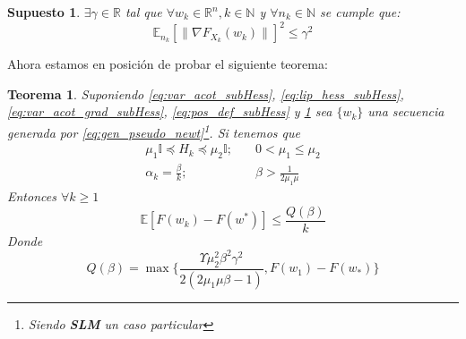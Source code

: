 \documentclass{book}
\theoremstyle{plain}
\newtheorem{thm}{Teorema}[section]
\newtheorem{assump}{Supuesto}[thm]
\theoremstyle{definition}
\theoremstyle{remark}
\begin{document}
 \begin{assump}\label{assump:moment_cota}
 $\exists\gamma\in\mathbb{R}$ tal que $\forall w_k\in \mathbb{R}^n, k\in\mathbb{N}$ y $\forall n_k\in \mathbb{N}$ se cumple que:
 \begin{equation}
     \mathbb{E}_{n_k}[\|\nabla F_{X_k}(w_k)\|]^2 \leq \gamma^2
 \end{equation}
 \end{assump}
Ahora estamos en posición de probar el siguiente teorema:
\begin{thm}
Suponiendo \ref{eq:var_acot_subHess}, \ref{eq:lip_hess_subHess}, \ref{eq:var_acot_grad_subHess}, \ref{eq:pos_def_subHess} y \ref{assump:moment_cota} sea $\{w_k\}$ una secuencia generada por \ref{eq:gen_pseudo_newt}\footnote{Siendo \textbf{SLM} un caso particular}. Si tenemos que
\begin{equation*}
\begin{split}
    \mu_1\mathbb{I} \preceq H_k \preceq \mu_2\mathbb{I}; &\quad 0<\mu_1\leq\mu_2\\
    \alpha_k = \frac{\beta}{k}; &\quad \beta>\frac{1}{2\mu_1\mu}
\end{split}
\end{equation*}
Entonces $\forall k\geq 1$
\begin{equation}\label{eq:to_proof_pseudo}
    \mathbb{E}[F(w_k) - F(w^*)] \leq \frac{Q(\beta)}{k}
\end{equation}
Donde
\begin{equation}
    Q(\beta) = \displaystyle\max\Bigg\{\frac{\Upsilon\mu_2^2\beta^2\gamma^2}{2(2\mu_1\mu\beta-1)}, F(w_1)- F(w_*)\Bigg\}
\end{equation}
\end{thm}
\end{document}

